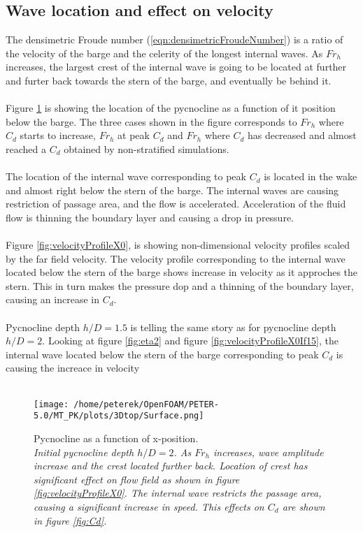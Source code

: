\documentclass[a4paper, 12pt]{report}
\begin{document}
\subsection{Wave location and effect on velocity}
The densimetric Froude number (\ref{eqn:densimetricFroudeNumber}) is a ratio of the velocity of the barge and the celerity of the longest internal waves. As $Fr_h$ increases, the largest crest of the internal wave is going to be located at further and furter back towards the stern of the barge, and eventually be behind it.\\
\\
Figure \ref{fig:eta1} is showing the location of the pycnocline as a function of it position below the barge. The three cases shown in the figure corresponds to $Fr_h$ where $C_d$ starts to increase, $Fr_h$ at peak $C_d$ and $Fr_h$ where $C_d$ has decreased and almost reached a $C_d$ obtained by non-stratified simulations.\\
\\
The location of the internal wave corresponding to peak $C_d$ is located in the wake and almost right below the stern of the barge. The internal waves are causing restriction of passage area, and the flow is accelerated. Acceleration of the fluid flow is thinning the boundary layer and causing a drop in pressure.\\
\\
Figure \ref{fig:velocityProfileX0}, is showing non-dimensional velocity profiles scaled by the far field velocity. The velocity profile corresponding to the internal wave located below the stern of the barge shows increase in velocity as it approches the stern. This in turn makes the pressure dop and a thinning of the boundary layer, causing an increase in $C_d$.\\
\\Pycnocline depth $h/D=1.5$ is telling the same story as for pycnocline depth $h/D=2$. Looking at figure \ref{fig:eta2} and figure \ref{fig:velocityProfileX0If15}, the internal wave located below the stern of the barge corresponding to peak $C_d$ is causing the increace in velocity\\
\\
\begin{minipage}[t]{.45\textwidth} 
	\begin{figure}[H]
		\centering
		\texttt{[image: /home/peterek/OpenFOAM/PETER-5.0/MT\_PK/plots/3Dtop/Surface.png]}
		\caption{Pycnocline as a function of x-position. \\ \textit{Initial pycnocline depth $h/D=2$. As $Fr_h$ increases, wave amplitude increase and the crest located further back. Location of crest has significant effect on flow field as shown in figure \ref{fig:velocityProfileX0}. The internal wave restricts the passage area, causing a significant increase in speed. This effects on $C_d$ are shown in figure \ref{fig:Cd}.}}
		\label{fig:eta1}
	\end{figure}
\end{minipage}\hfill
\end{document}
